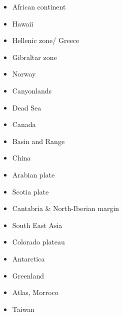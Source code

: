 \begin{itemize}
{\scriptsize
\cite{clbm04}
\cite{isms05}
\cite{nehe06}
\cite{sepg19}
}
\item African continent 
{\scriptsize
\cite{gikb94}
\cite{vabt11}
\cite{busm12}
\cite{gagb14}
\cite{wakc17}
\cite{cels20}
}
\item Hawaii 
{\scriptsize
\cite{vazh03}
\cite{tabs09}
\cite{zhwa13}
\cite{botb19}
}
\item Hellenic zone/ Greece  
{\scriptsize
\cite{spwv88}
\cite{guhf13}
}
\item Gibraltar zone 
{\scriptsize
\cite{gumr02}
\cite{fufa10}
\cite{miab13}
\cite{medd15}
\cite{casv19}
} 
\item Norway 
{\scriptsize
\cite{soma13}
\cite{bubj15}
}
\item Canyonlands 
{\scriptsize
\cite{trca94}
\cite{scwa02}
\cite{grsk03}
}
\item Dead Sea 
{\scriptsize
\cite{sopg05}
}
\item Canada 
{\scriptsize
\cite{brbw93}
\cite{pelj99}
}
\item Basin and Range 
{\scriptsize
\cite{brbe89c}
\cite{wefr09}
}
\item China 
{\scriptsize
\cite{zhst10}
\cite{wazh15}
}
\item Arabian plate 
{\scriptsize
\cite{rerl15}
}
\item Scotia plate 
{\scriptsize
\cite{necb13}
}
\item Cantabria \& North-Iberian margin 
{\scriptsize
\cite{clbb02}
\cite{peap15}
}
\item South East Asia 
{\scriptsize
\cite{rekv04}
\cite{yotr15}\cite{hasp15}\cite{meds15}
\cite{necg16}
}
\item Colorado plateau 
{\scriptsize
\cite{vabv10}
\cite{lesm11}
}
\item Antarctica  
{\scriptsize
\cite{huha07}
}
\item Greenland  
{\scriptsize
\cite{stsj15}\cite{heps15}\cite{stbl19}
}
\item Atlas, Morroco  
{\scriptsize
\cite{kava14}
}
\item Taiwan  
{\scriptsize
\cite{chys01}\cite{liku16}
}

\end{itemize}






